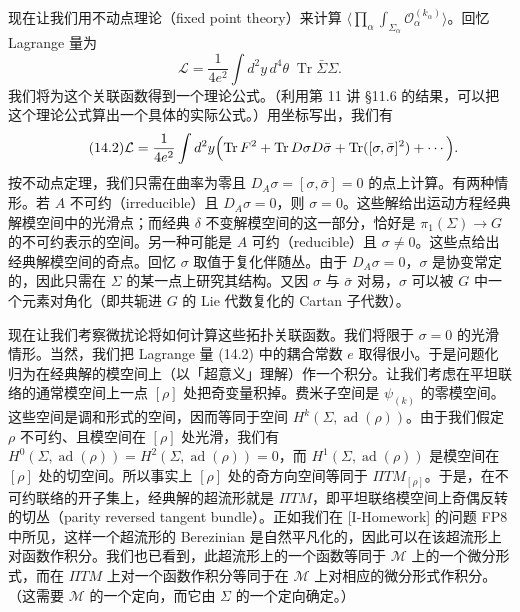 现在让我们用不动点理论（fixed point theory）来计算 $\bigl\langle\prod_\alpha\int_{\Sigma_\alpha}\mathcal O_\alpha^{(k_\alpha)}\bigr\rangle$。回忆 Lagrange 量为
\[
  \mathcal L=\frac{1}{4e^2}\int d^2y\,d^4\theta\;\operatorname{Tr}\bar\Sigma\Sigma.
\]
我们将为这个关联函数得到一个理论公式。（利用第 11 讲 §11.6 的结果，可以把这个理论公式算出一个具体的实际公式。）用坐标写出，我们有
\begin{equation}
  \tag{14.2}
  \label{eq:14-2}
  \mathcal L=\frac{1}{4e^2}\int d^2y\Bigl(\operatorname{Tr}F^2+\operatorname{Tr}D\sigma D\bar\sigma+\operatorname{Tr}([\sigma,\bar\sigma]^2)+\cdots\Bigr).
\end{equation}
按不动点定理，我们只需在曲率为零且 $D_A\sigma=[\sigma,\bar\sigma]=0$ 的点上计算。有两种情形。若 $A$ 不可约（irreducible）且 $D_A\sigma=0$，则 $\sigma=0$。这些解给出运动方程经典解模空间中的光滑点；而经典 $\delta$ 不变解模空间的这一部分，恰好是 $\pi_1(\Sigma)\to G$ 的不可约表示的空间。另一种可能是 $A$ 可约（reducible）且 $\sigma\ne0$。这些点给出经典解模空间的奇点。回忆 $\sigma$ 取值于复化伴随丛。由于 $D_A\sigma=0$，$\sigma$ 是协变常定的，因此只需在 $\Sigma$ 的某一点上研究其结构。又因 $\sigma$ 与 $\bar\sigma$ 对易，$\sigma$ 可以被 $G$ 中一个元素对角化（即共轭进 $G$ 的 Lie 代数复化的 Cartan 子代数）。


现在让我们考察微扰论将如何计算这些拓扑关联函数。我们将限于 $\sigma=0$ 的光滑情形。当然，我们把 Lagrange 量 (14.2) 中的耦合常数 $e$ 取得很小。于是问题化归为在经典解的模空间上（以「超意义」理解）作一个积分。让我们考虑在平坦联络的通常模空间上一点 $[\rho]$ 处把奇变量积掉。费米子空间是 $\psi_{(k)}$ 的零模空间。这些空间是调和形式的空间，因而等同于空间 $H^k(\Sigma,\operatorname{ad}(\rho))$。由于我们假定 $\rho$ 不可约、且模空间在 $[\rho]$ 处光滑，我们有 $H^0(\Sigma,\operatorname{ad}(\rho))=H^2(\Sigma,\operatorname{ad}(\rho))=0$，而 $H^1(\Sigma,\operatorname{ad}(\rho))$ 是模空间在 $[\rho]$ 处的切空间。所以事实上 $[\rho]$ 处的奇方向空间等同于 $\Pi TM_{[\rho]}$。于是，在不可约联络的开子集上，经典解的超流形就是 $\Pi TM$，即平坦联络模空间上奇偶反转的切丛（parity reversed tangent bundle）。正如我们在 [I-Homework] 的问题 FP8 中所见，这样一个超流形的 Berezinian 是自然平凡化的，因此可以在该超流形上对函数作积分。我们也已看到，此超流形上的一个函数等同于 $\mathcal M$ 上的一个微分形式，而在 $\Pi TM$ 上对一个函数作积分等同于在 $\mathcal M$ 上对相应的微分形式作积分。（这需要 $\mathcal M$ 的一个定向，而它由 $\Sigma$ 的一个定向确定。）

